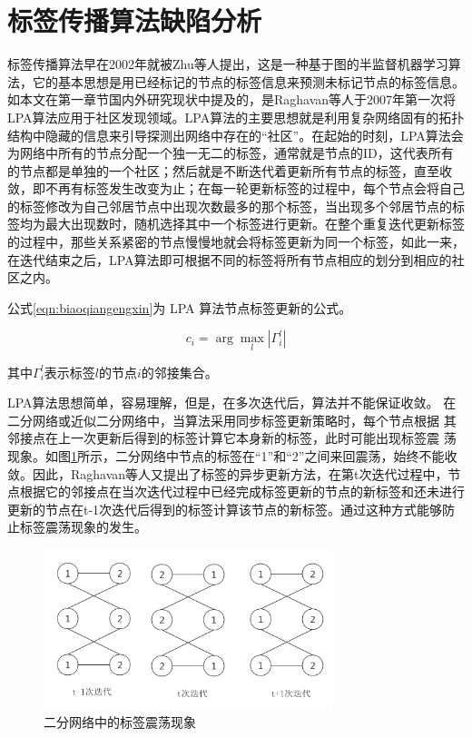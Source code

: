 \section{标签传播算法缺陷分析}
标签传播算法早在2002年就被Zhu等人\cite{Zhu2002Learning}提出，这是一种基于图的半监督机器学习算法，它的基本思想是用已经标记的节点的标签信息来预测未标记节点的标签信息。如本文在第一章节国内外研究现状中提及的，是Raghavan等人\cite{Raghavan2007Near}于2007年第一次将LPA算法应用于社区发现领域。LPA算法的主要思想就是利用复杂网络固有的拓扑结构中隐藏的信息来引导探测出网络中存在的“社区”。在起始的时刻，LPA算法会为网络中所有的节点分配一个独一无二的标签，通常就是节点的ID，这代表所有的节点都是单独的一个社区；然后就是不断迭代着更新所有节点的标签，直至收敛，即不再有标签发生改变为止；在每一轮更新标签的过程中，每个节点会将自己的标签修改为自己邻居节点中出现次数最多的那个标签，当出现多个邻居节点的标签均为最大出现数时，随机选择其中一个标签进行更新。在整个重复迭代更新标签的过程中，那些关系紧密的节点慢慢地就会将标签更新为同一个标签，如此一来，在迭代结束之后，LPA算法即可根据不同的标签将所有节点相应的划分到相应的社区之内。

公式\ref{eqn:biaoqiangengxin}为 LPA 算法节点标签更新的公式。

\begin{equation}
  \label{eqn:biaoqiangengxin}
  c_i=\arg\max_l \left | \Gamma _i^l \right |
\end{equation}

其中$\Gamma _i^l$表示标签$l$的节点$i$的邻接集合。

LPA算法思想简单，容易理解，但是，在多次迭代后，算法并不能保证收敛。
在二分网络或近似二分网络中，当算法采用同步标签更新策略时，每个节点根据
其邻接点在上一次更新后得到的标签计算它本身新的标签，此时可能出现标签震
荡现象。如图\ref{fig:fig3-1}所示，二分网络中节点的标签在“1”和“2”之间来回震荡，始终不能收敛。因此，Raghavan等人\cite{Raghavan2007Near}又提出了标签的异步更新方法，在第t次迭代过程中，节点根据它的邻接点在当次迭代过程中已经完成标签更新的节点的新标签和还未进行更新的节点在t-1次迭代后得到的标签计算该节点的新标签。通过这种方式能够防止标签震荡现象的发生。

\begin{figure}
 \centering
 \includegraphics[width=0.75\textwidth]{figures/fig3-1}
 \caption{二分网络中的标签震荡现象}\label{fig:fig3-1}
\end{figure}

